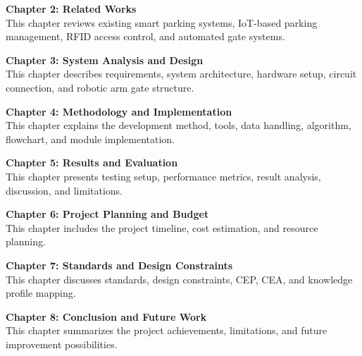 \textbf{Chapter 2: Related Works}\\
This chapter reviews existing smart parking systems, IoT-based parking management, RFID access control, and automated gate systems.

\textbf{Chapter 3: System Analysis and Design}\\
This chapter describes requirements, system architecture, hardware setup, circuit connection, and robotic arm gate structure.

\textbf{Chapter 4: Methodology and Implementation}\\
This chapter explains the development method, tools, data handling, algorithm, flowchart, and module implementation.

\textbf{Chapter 5: Results and Evaluation}\\
This chapter presents testing setup, performance metrics, result analysis, discussion, and limitations.

\textbf{Chapter 6: Project Planning and Budget}\\
This chapter includes the project timeline, cost estimation, and resource planning.

\textbf{Chapter 7: Standards and Design Constraints}\\
This chapter discusses standards, design constraints, CEP, CEA, and knowledge profile mapping.

\textbf{Chapter 8: Conclusion and Future Work}\\
This chapter summarizes the project achievements, limitations, and future improvement possibilities.

